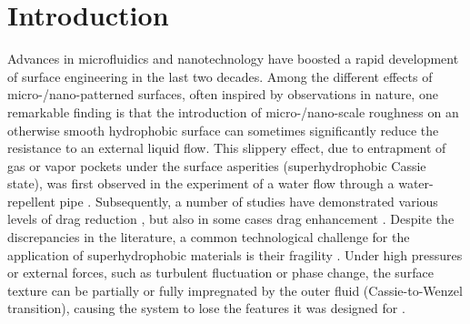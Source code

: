 

\section{Introduction}

Advances in microfluidics and nanotechnology have boosted a rapid development of surface engineering in the last two decades. Among the different effects of micro-/nano-patterned surfaces, often inspired by observations in nature, one remarkable finding is that the introduction of micro-/nano-scale roughness on an otherwise smooth hydrophobic surface can sometimes significantly reduce the resistance to an external liquid flow. This slippery effect, due to entrapment of gas or vapor pockets under the surface asperities (superhydrophobic Cassie state), was first observed in the experiment of a water flow through a water-repellent pipe \cite{Watanabe}. Subsequently, a number of studies have demonstrated various levels of drag reduction \cite{Ou,Choi_Kim,Schaffel,Lee}, but also in some cases drag enhancement \cite{Steinberger,Karatay}. Despite the discrepancies in the literature, a common technological challenge for the application of superhydrophobic materials is their fragility \cite{Bocquet}. Under high pressures or external forces, such as turbulent fluctuation or phase change, the surface texture can be partially or fully impregnated by the outer fluid (Cassie-to-Wenzel transition), causing the system to lose the features it was designed for \cite{Gentili,Giacomello, Seo_etal_18}.

